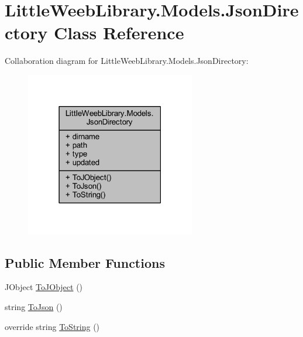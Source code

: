 \hypertarget{class_little_weeb_library_1_1_models_1_1_json_directory}{}\section{Little\+Weeb\+Library.\+Models.\+Json\+Directory Class Reference}
\label{class_little_weeb_library_1_1_models_1_1_json_directory}


Collaboration diagram for Little\+Weeb\+Library.\+Models.\+Json\+Directory\+:\nopagebreak
\begin{figure}[H]
\begin{center}
\leavevmode
\includegraphics[width=210pt]{class_little_weeb_library_1_1_models_1_1_json_directory__coll__graph}
\end{center}
\end{figure}
\subsection*{Public Member Functions}
\begin{DoxyCompactItemize}
\item 
J\+Object \mbox{\hyperlink{class_little_weeb_library_1_1_models_1_1_json_directory_ab50f54381142e811a8a1289d4b5e83e7}{To\+J\+Object}} ()
\item 
string \mbox{\hyperlink{class_little_weeb_library_1_1_models_1_1_json_directory_a3527cf5cff598f63b5f95cf7d6158b55}{To\+Json}} ()
\item 
override string \mbox{\hyperlink{class_little_weeb_library_1_1_models_1_1_json_directory_a8fb3f3abbc3d89fa3a3fc6f7966fc4f9}{To\+String}} ()
\end{DoxyCompactItemize}
